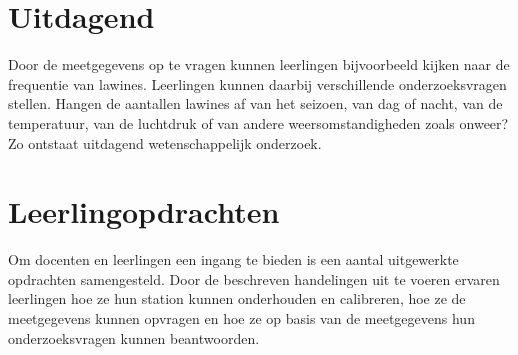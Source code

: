 \section{Uitdagend}

Door de meetgegevens op te vragen kunnen leerlingen bijvoorbeeld kijken
naar de frequentie van lawines.  Leerlingen kunnen daarbij verschillende
onderzoeksvragen stellen. Hangen de aantallen lawines af van het
seizoen, van dag of nacht, van de temperatuur, van de luchtdruk of van
andere weersomstandigheden zoals onweer? Zo ontstaat uitdagend
wetenschappelijk onderzoek.


\section{Leerlingopdrachten}

Om docenten en leerlingen een ingang te bieden is een aantal
uitgewerkte opdrachten samengesteld. Door de beschreven handelingen uit
te voeren ervaren leerlingen hoe ze hun \hisparc station kunnen
onderhouden en calibreren, hoe ze de meetgegevens kunnen opvragen en hoe
ze op basis van de meetgegevens hun onderzoeksvragen kunnen beantwoorden.


